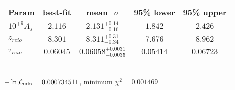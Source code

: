 \begin{tabular}{|l|c|c|c|c|} 
 \hline 
Param & best-fit & mean$\pm\sigma$ & 95\% lower & 95\% upper \\ \hline 
$10^{+9}A_{s }$ &$2.116$ & $2.131_{-0.16}^{+0.14}$ & $1.842$ & $2.426$ \\ 
$z_{reio }$ &$8.301$ & $8.311_{-0.34}^{+0.31}$ & $7.676$ & $8.962$ \\ 
$\tau{}_{reio }$ &$0.06045$ & $0.06058_{-0.0035}^{+0.0031}$ & $0.05414$ & $0.06723$ \\ 
\hline 
 \end{tabular} \\ 
$-\ln{\cal L}_\mathrm{min} =0.000734511$, minimum $\chi^2=0.001469$ \\ 
